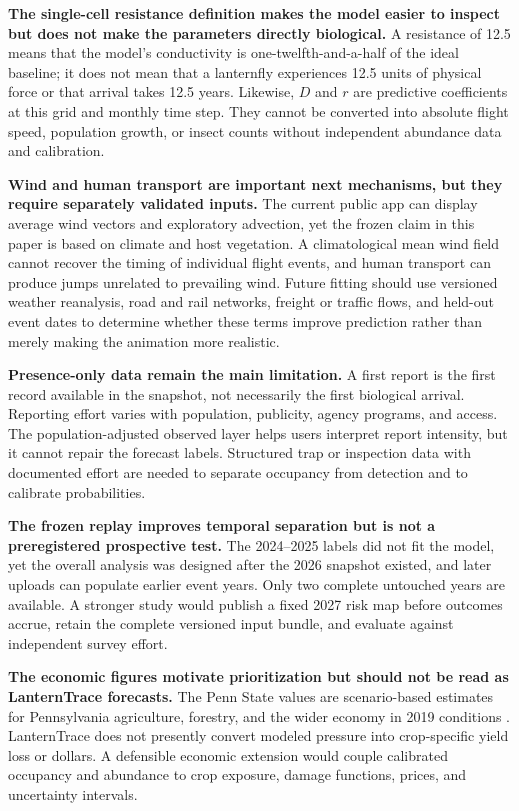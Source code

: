 \documentclass{article}
\begin{document}
\textbf{The single-cell resistance definition makes the model easier to inspect but does not make the parameters directly biological.} A resistance of 12.5 means that the model's conductivity is one-twelfth-and-a-half of the ideal baseline; it does not mean that a lanternfly experiences 12.5 units of physical force or that arrival takes 12.5 years. Likewise, $D$ and $r$ are predictive coefficients at this grid and monthly time step. They cannot be converted into absolute flight speed, population growth, or insect counts without independent abundance data and calibration.

\textbf{Wind and human transport are important next mechanisms, but they require separately validated inputs.} The current public app can display average wind vectors and exploratory advection, yet the frozen claim in this paper is based on climate and host vegetation. A climatological mean wind field cannot recover the timing of individual flight events, and human transport can produce jumps unrelated to prevailing wind. Future fitting should use versioned weather reanalysis, road and rail networks, freight or traffic flows, and held-out event dates to determine whether these terms improve prediction rather than merely making the animation more realistic.

\textbf{Presence-only data remain the main limitation.} A first report is the first record available in the snapshot, not necessarily the first biological arrival. Reporting effort varies with population, publicity, agency programs, and access. The population-adjusted observed layer helps users interpret report intensity, but it cannot repair the forecast labels. Structured trap or inspection data with documented effort are needed to separate occupancy from detection and to calibrate probabilities.

\textbf{The frozen replay improves temporal separation but is not a preregistered prospective test.} The 2024--2025 labels did not fit the model, yet the overall analysis was designed after the 2026 snapshot existed, and later uploads can populate earlier event years. Only two complete untouched years are available. A stronger study would publish a fixed 2027 risk map before outcomes accrue, retain the complete versioned input bundle, and evaluate against independent survey effort.

\textbf{The economic figures motivate prioritization but should not be read as LanternTrace forecasts.} The Penn State values are scenario-based estimates for Pennsylvania agriculture, forestry, and the wider economy in 2019 conditions \cite{harper2019}. LanternTrace does not presently convert modeled pressure into crop-specific yield loss or dollars. A defensible economic extension would couple calibrated occupancy and abundance to crop exposure, damage functions, prices, and uncertainty intervals.
\end{document}

